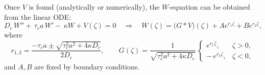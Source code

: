 \documentclass{article}
\begin{document}
\begin{description}
\begin{itemize}
\begin{itemize}
\par 
Once $V$ is found (analytically or numerically), the $W$-equation can be obtained from the linear ODE:
\begin{equation*}
D_c\,W''+\,\tau_c a\,W' -\,\kappa W +  V(\zeta)=0\quad \Longrightarrow\quad 
W(\zeta) = \bigl(G * V\bigr)(\zeta) + A e^{r_1\zeta} + B e^{r_2\zeta},
\end{equation*}
where
\begin{equation*}
r_{1,2}=\frac{-\tau_c a \pm \sqrt{\tau_c^2 a^2 + 4\kappa D_c}}{2D_c},\qquad
G(\zeta)=\frac{1}{\sqrt{\tau_c^2 a^2 + 4\kappa D_c}}\,
\begin{cases}
e^{r_1\zeta}, & \zeta>0,\\[2pt]
-\,e^{r_2\zeta}, & \zeta<0,
\end{cases}
\end{equation*}
and $A,B$ are fixed by boundary conditions. 
\end{itemize}


\end{itemize}
\end{description}
\end{document}
